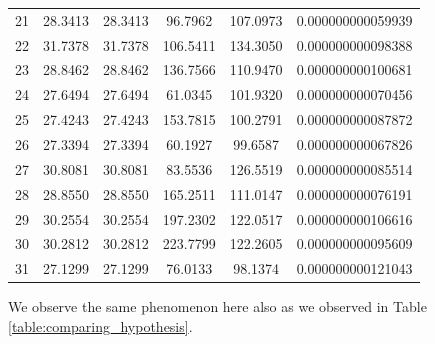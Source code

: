 \begin{center}
\begin{scriptsize}
\begin{tabular}{l*{4}{c}r}
21 & 28.3413 & 28.3413 & 96.7962 & 107.0973 & 0.000000000059939\\
22 & 31.7378 & 31.7378 & 106.5411 & 134.3050 & 0.000000000098388\\
23 & 28.8462 & 28.8462 & 136.7566 & 110.9470 & 0.000000000100681\\
24 & 27.6494 & 27.6494 & 61.0345 & 101.9320 & 0.000000000070456\\
25 & 27.4243 & 27.4243 & 153.7815 & 100.2791 & 0.000000000087872\\
26 & 27.3394 & 27.3394 & 60.1927 & 99.6587 & 0.000000000067826\\
27 & 30.8081 & 30.8081 & 83.5536 & 126.5519 & 0.000000000085514\\
28 & 28.8550 & 28.8550 & 165.2511 & 111.0147 & 0.000000000076191\\
29 & 30.2554 & 30.2554 & 197.2302 & 122.0517 & 0.000000000106616\\
30 & 30.2812 & 30.2812 & 223.7799 & 122.2605 & 0.000000000095609\\
31 & 27.1299 & 27.1299 & 76.0133 & 98.1374 & 0.000000000121043\\\end{tabular}
\end{scriptsize}
\end{center}
We observe the same phenomenon here also as we observed in Table \ref{table:comparing_hypothesis}. 
\fi
